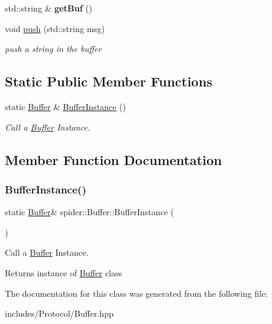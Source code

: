 \begin{DoxyCompactItemize}
\mbox{\label{classspider_1_1_buffer_ae3b4ade260f5fbfd7a3bac5f70e502b5}} 
std\+::string \& {\bfseries get\+Buf} ()
\item 
\mbox{\label{classspider_1_1_buffer_a4fa3b2d0971335b1262f2b2a769026e6}} 
void \hyperlink{classspider_1_1_buffer_a4fa3b2d0971335b1262f2b2a769026e6}{push} (std\+::string msg)
\begin{DoxyCompactList}\small\item\em push a string in the buffer \end{DoxyCompactList}\end{DoxyCompactItemize}
\subsection*{Static Public Member Functions}
\begin{DoxyCompactItemize}
\item 
static \hyperlink{classspider_1_1_buffer}{Buffer} \& \hyperlink{classspider_1_1_buffer_abae91c98adccc8b4813271cd2545be92}{Buffer\+Instance} ()
\begin{DoxyCompactList}\small\item\em Call a \hyperlink{classspider_1_1_buffer}{Buffer} Instance. \end{DoxyCompactList}\end{DoxyCompactItemize}


\subsection{Member Function Documentation}
\mbox{\label{classspider_1_1_buffer_abae91c98adccc8b4813271cd2545be92}} 
\subsubsection{\texorpdfstring{Buffer\+Instance()}{BufferInstance()}}
{\footnotesize\ttfamily static \hyperlink{classspider_1_1_buffer}{Buffer}\& spider\+::\+Buffer\+::\+Buffer\+Instance (\begin{DoxyParamCaption}{ }\end{DoxyParamCaption})\hspace{0.3cm}{\ttfamily [static]}}



Call a \hyperlink{classspider_1_1_buffer}{Buffer} Instance. 

\begin{DoxyReturn}{Returns}
instance of \hyperlink{classspider_1_1_buffer}{Buffer} class 
\end{DoxyReturn}


The documentation for this class was generated from the following file\+:\begin{DoxyCompactItemize}
\item 
includes/\+Protocol/Buffer.\+hpp\end{DoxyCompactItemize}
